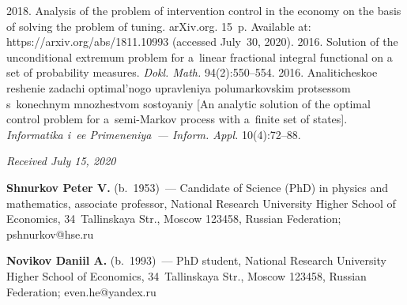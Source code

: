 \begin{multicols}{2}
{{\begin{thebibliography}{99}
 2018. 
Analysis of the problem of intervention control in the economy on the 
basis of solving the problem of tuning. 
{arXiv.org}. 15~p. Available at: 
 {\sf https://arxiv.org/abs/1811.10993} (accessed July~30, 2020).
 2016. Solution of the unconditional extremum problem for 
 a~linear fractional integral functional on a set of probability measures. 
  \textit{Dokl. Math.} 94(2):550--554.
 2016. Analiticheskoe reshenie zadachi optimal'nogo upravleniya 
 polumarkovskim protsessom s~konechnym mnozhestvom sostoyaniy 
 [An analytic solution of the optimal control problem for 
 a~semi-Markov process with a~finite set of states]. 
 \textit{Informatika i~ee Primeneniya~--- Inform. Appl.} 10(4):72--88.
 \end{thebibliography}

 }
 }

\end{multicols}

\vspace*{-6pt}

\hfill{\small\textit{Received July 15, 2020}}



\Contr

\noindent
\textbf{Shnurkov Peter V.} (b.\ 1953)~--- 
Candidate of Science (PhD) in physics and mathematics, associate professor, 
National Research University Higher School of Economics, 34~Tallinskaya Str., 
Moscow 123458, Russian Federation; \mbox{pshnurkov@hse.ru}

\vspace*{3pt}

\noindent
\textbf{Novikov Daniil A.} (b.\ 1993)~--- 
PhD student, National Research University Higher School of Economics, 
34~Tallinskaya Str., Moscow 123458, Russian Federation; \mbox{even.he@yandex.ru}


\label{end\stat}

\renewcommand{\bibname}{\protect\rm Литература} 

\renewcommand{\figurename}{\protect\bf Рис.}
